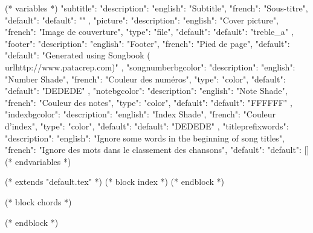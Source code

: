 

(* variables *)
{
"subtitle": {"description": {"english": "Subtitle", "french": "Sous-titre"},
            "default": {"default": ""}
            },
"picture": {"description": {"english": "Cover picture", "french": "Image de couverture"},
            "type": "file",
            "default": {"default": "treble_a"}
         },
"footer": {"description": {"english": "Footer", "french": "Pied de page"},
           "default": {"default": "Generated using Songbook (\\url{http://www.patacrep.com})"}
        },
"songnumberbgcolor": {"description": {"english": "Number Shade", "french": "Couleur des numéros"},
                     "type": "color",
                     "default": {"default": "DEDEDE"}
                  },
"notebgcolor": {"description": {"english": "Note Shade", "french": "Couleur des notes"},
               "type": "color",
               "default": {"default": "FFFFFF"}
            },
"indexbgcolor": {"description": {"english": "Index Shade", "french": "Couleur d'index"},
               "type": "color",
               "default": {"default": "DEDEDE"}
            },
"titleprefixwords": {"description": {"english": "Ignore some words in the beginning of song titles",
                                     "french": "Ignore des mots dans le classement des chansons"},
                     "default": {"default": []}
                     }
}
(* endvariables *)

(* extends "default.tex" *)
(* block index *)
(* endblock *)

(* block chords *)
    
(* endblock *)

